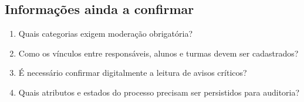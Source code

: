 \subsection{Informações ainda a confirmar}
\begin{enumerate}
\item Quais categorias exigem moderação obrigatória?
\item Como os vínculos entre responsáveis, alunos e turmas devem ser cadastrados?
\item É necessário confirmar digitalmente a leitura de avisos críticos?
\item Quais atributos e estados do processo precisam ser persistidos para auditoria?
\end{enumerate}
